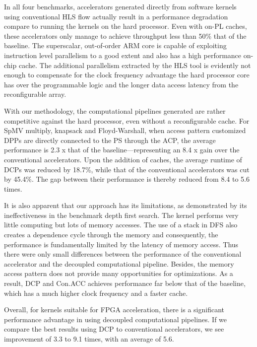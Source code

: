 In all four benchmarks, accelerators generated directly from software kernels using conventional HLS flow
actually result in a performance degradation compare to running the kernels on the hard processor. Even with
on-PL caches, 
these accelerators only manage to achieve throughput less than 50\% that of the baseline. 
The superscalar, 
out-of-order ARM core is capable of exploiting instruction level parallelism to a good extent 
and also has a high performance on-chip cache.
The additional parallelism extracted by the HLS tool is evidently not enough
to compensate for the clock frequency advantage the hard processor core has over the programmable logic and the longer data access
latency from the reconfigurable array. 

With our methodology, the computational pipelines generated 
are rather competitive against the hard processor, even
without a reconfigurable cache. For SpMV multiply, knapsack and Floyd-Warshall, when access pattern customized DPPs are directly connected to the PS through the ACP, 
the average performance is 2.3 x that of the baseline---representing
an 8.4 x gain over the conventional accelerators.
Upon the addition of caches,  
the average runtime of DCPs was reduced by 18.7\%,  while that of the conventional
accelerators was cut by 45.4\%. The gap between their performance is thereby reduced from 8.4 to 5.6 times. 


It is also apparent that our approach has its limitations, as demonstrated by its ineffectiveness in the benchmark depth first search.
The kernel performs very little computing but lots of memory accesses.
The use of a stack in DFS also creates a dependence cycle through the memory
and consequently, the performance is fundamentally limited by the latency of memory access.
Thus there were only small differences between the performance of the conventional accelerator and the decoupled computational pipeline. Besides, the memory access pattern
does not provide many opportunities for optimizations. As a result, DCP and Con.ACC achieves performance far below that of the baseline, 
which has a much higher clock frequency and a faster cache.     

Overall, for kernels suitable for FPGA acceleration, there is a significant performance advantage in using
decoupled computational pipelines. If we compare the best results using DCP to conventional accelerators, we see improvement
of 3.3 to 9.1 times, with an average of 5.6. 

